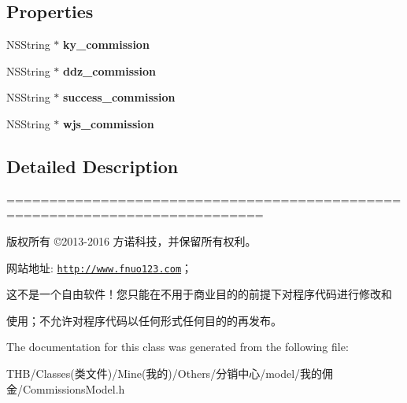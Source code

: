 \subsection*{Properties}
\begin{DoxyCompactItemize}
\item 
\mbox{\label{interface_commissions_model_ae06537d425bcdfed155e5066a11665e7}} 
N\+S\+String $\ast$ {\bfseries ky\+\_\+commission}
\item 
\mbox{\label{interface_commissions_model_af410eccd4d0cfc272cab6cc9bc82f1d6}} 
N\+S\+String $\ast$ {\bfseries ddz\+\_\+commission}
\item 
\mbox{\label{interface_commissions_model_ab56e5198c14d505605bf6ebe40a0847c}} 
N\+S\+String $\ast$ {\bfseries success\+\_\+commission}
\item 
\mbox{\label{interface_commissions_model_a6ca9b41f63659512019680d0e5648c44}} 
N\+S\+String $\ast$ {\bfseries wjs\+\_\+commission}
\end{DoxyCompactItemize}


\subsection{Detailed Description}
============================================================================

版权所有 ©2013-\/2016 方诺科技，并保留所有权利。

网站地址\+: \href{http://www.fnuo123.com}{\tt http\+://www.\+fnuo123.\+com}； 



这不是一个自由软件！您只能在不用于商业目的的前提下对程序代码进行修改和

使用；不允许对程序代码以任何形式任何目的的再发布。 

 

The documentation for this class was generated from the following file\+:\begin{DoxyCompactItemize}
\item 
T\+H\+B/\+Classes(类文件)/\+Mine(我的)/\+Others/分销中心/model/我的佣金/Commissions\+Model.\+h\end{DoxyCompactItemize}
